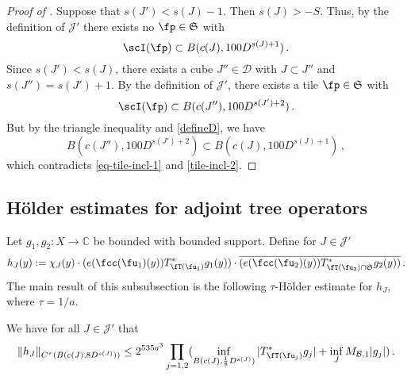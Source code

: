     \begin{proof}[Proof of ]
        \leanok
        Suppose that $s(J') < s(J) - 1$. Then $s(J) > -S$. Thus, by the definition of $\mathcal{J}'$ there exists no $\fp \in \mathfrak{S}$ with
      \begin{equation}
            \label{eq-tile-incl-1}
            \scI(\fp) \subset B(c(J), 100D^{s(J) + 1})\,.
        \end{equation}
        Since $s(J') < s(J)$, there exists a cube $J'' \in \mathcal{D}$ with $J \subset J''$ and $s(J'') = s(J') + 1$. By the definition of $\mathcal{J}'$, there exists a tile $\fp \in \mathfrak{S}$ with
      \begin{equation}
            \label{tile-incl-2}
            \scI(\fp) \subset B(c(J''), 100 D^{s(J')+2})\,.
        \end{equation}
        But by the triangle inequality and \eqref{defineD}, we have
        $$
            B(c(J''), 100 D^{s(J')+2}) \subset B(c(J), 100D^{s(J) + 1})\,,
        $$
        which contradicts \eqref{eq-tile-incl-1} and \eqref{tile-incl-2}.
    \end{proof}


\subsection{H\"older estimates for adjoint tree operators}
\label{subsubsec-holder-estimates}
    Let $g_1, g_2:X \to \mathbb{C}$ be bounded with bounded support.
    Define for $J \in \mathcal{J}'$
    \begin{equation}
        \label{def-hj}
        h_J(y) := \chi_J(y)\cdot(e(\fcc(\fu_1)(y)) T_{\fT(\fu_1)}^* g_1(y)) \cdot \overline{(e(\fcc(\fu_2)(y)) T_{\fT(\fu_2) \cap \mathfrak{S}}^* g_2(y))}\,.
    \end{equation}
    The main result of this subsubsection is the following $\tau$-H\"older estimate for $h_J$, where $\tau = 1/a$.

    \begin{lemma}
        \label{Holder-correlation-tree}
        \leanok
        We have for all $J \in \mathcal{J}'$ that
      \begin{equation}
            \label{hHolder}
            \|h_J\|_{C^{\tau}(B(c(J), 8D^{s(J)}))} \le 2^{535a^3} \prod_{j = 1,2} (\inf_{B(c(J), \frac{1}{8}D^{s(J)})} |T_{\fT(\fu_j)}^* g_j| + \inf_J M_{\mathcal{B}, 1} |g_j|)\,.
        \end{equation}
    \end{lemma}

